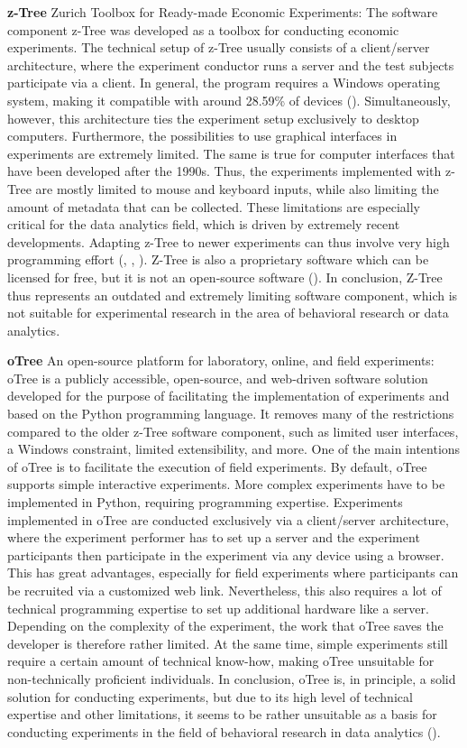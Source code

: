 \textbf{z-Tree} Zurich Toolbox for Ready-made Economic Experiments:
The software component z-Tree was developed as a toolbox for conducting economic experiments. The technical setup of z-Tree usually consists of a client/server architecture, where the experiment conductor runs a server and the test subjects participate via a client. In general, the program requires a Windows operating system, making it compatible with around 28.59\% of devices (\cite{statcounter.2023}). Simultaneously, however, this architecture ties the experiment setup exclusively to desktop computers. Furthermore, the possibilities to use graphical interfaces in experiments are extremely limited. The same is true for computer interfaces that have been developed after the 1990s. Thus, the experiments implemented with z-Tree are mostly limited to mouse and keyboard inputs, while also limiting the amount of metadata that can be collected. These limitations are especially critical for the data analytics field, which is driven by extremely recent developments. Adapting z-Tree to newer experiments can thus involve very high programming effort (\cite{Zurich.2023}, \cite{Fischbacher.2006}, \cite{Chen.2016}). Z-Tree is also a proprietary software which can be licensed for free, but it is not an open-source software (\cite{Fischbacher.2006}). In conclusion, Z-Tree thus represents an outdated and extremely limiting software component, which is not suitable for experimental research in the area of behavioral research or data analytics.

\textbf{oTree} An open-source platform for laboratory, online, and field experiments:
oTree is a publicly accessible, open-source, and web-driven software solution developed for the purpose of facilitating the implementation of experiments and based on the Python programming language. It removes many of the restrictions compared to the older z-Tree software component, such as limited user interfaces, a Windows constraint, limited extensibility, and more. One of the main intentions of oTree is to facilitate the execution of field experiments. By default, oTree supports simple interactive experiments. More complex experiments have to be implemented in Python, requiring programming expertise. Experiments implemented in oTree are conducted exclusively via a client/server architecture, where the experiment performer has to set up a server and the experiment participants then participate in the experiment via any device using a browser. This has great advantages, especially for field experiments where participants can be recruited via a customized web link. Nevertheless, this also requires a lot of technical programming expertise to set up additional hardware like a server. Depending on the complexity of the experiment, the work that oTree saves the developer is therefore rather limited. At the same time, simple experiments still require a certain amount of technical know-how, making oTree unsuitable for non-technically proficient individuals. In conclusion, oTree is, in principle, a solid solution for conducting experiments, but due to its high level of technical expertise and other limitations, it seems to be rather unsuitable as a basis for conducting experiments in the field of behavioral research in data analytics (\cite{Chen.2016}). 

